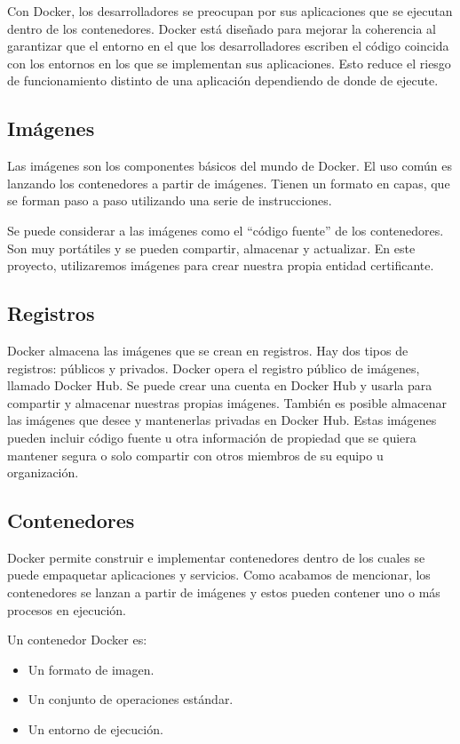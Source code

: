Con Docker, los desarrolladores se preocupan por sus aplicaciones que se ejecutan 
dentro de los contenedores. Docker está diseñado para mejorar la coherencia al 
garantizar que el entorno en el que los desarrolladores escriben el código coincida 
con los entornos en los que se implementan sus aplicaciones. Esto reduce el riesgo 
de funcionamiento distinto de una aplicación dependiendo de donde de ejecute.


\subsection{Imágenes}
Las imágenes son los componentes básicos del mundo de Docker. El uso común es 
lanzando los contenedores a partir de imágenes. Tienen un formato en capas, que 
se forman paso a paso utilizando una serie de instrucciones.

Se puede considerar a las imágenes como el “código fuente” de los contenedores. 
Son muy portátiles y se pueden compartir, almacenar y actualizar. En este proyecto, 
utilizaremos imágenes para crear nuestra propia entidad certificante.

\subsection{Registros}
Docker almacena las imágenes que se crean en registros. Hay dos tipos de 
registros: públicos y privados. Docker opera el registro público de imágenes, 
llamado Docker Hub. Se puede crear una cuenta en Docker Hub y usarla para 
compartir y almacenar nuestras propias imágenes. También es posible almacenar 
las imágenes que desee y mantenerlas privadas en Docker Hub. Estas imágenes 
pueden incluir código fuente u otra información de propiedad que se quiera 
mantener segura o solo compartir con otros miembros de su equipo u organización.

\subsection{Contenedores}
Docker permite construir e implementar contenedores dentro de los cuales se puede 
empaquetar aplicaciones y servicios. Como acabamos de mencionar, los contenedores 
se lanzan a partir de imágenes y estos pueden contener uno o más procesos en ejecución.

\noindent Un contenedor Docker es:
\begin{itemize}
    \setlength\itemsep{-0.6em}
    \item Un formato de imagen.
    \item Un conjunto de operaciones estándar.
    \item Un entorno de ejecución.
\end{itemize}


